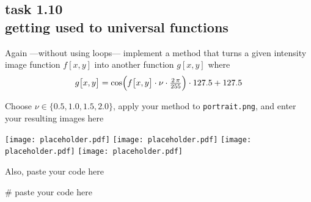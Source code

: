 
\subsection*{task 1.10 \\[1ex] getting used to universal functions}

Again ---without using  loops--- implement a method that turns a given intensity image function $f[x, y]$ into another function $g[x, y]$ where
\begin{equation*}
g \bigl[ x, y \bigr] = \cos \Bigl( f \bigl[ x, y \bigr] \cdot \nu \cdot \tfrac{2\,\pi}{255} \Bigr) \cdot 127.5 + 127.5
\end{equation*}

\vspace{1cm}
Choose $\nu \in \{ 0.5, 1.0, 1.5, 2.0 \}$, apply your method to \texttt{portrait.png}, and enter your resulting images here
\begin{center}
\texttt{[image: placeholder.pdf]} \hfill
\texttt{[image: placeholder.pdf]} \hfill
\texttt{[image: placeholder.pdf]} \hfill
\texttt{[image: placeholder.pdf]} 
\end{center}



\vspace{2cm}
Also, paste your code here \\[1ex]
\begin{python}
# paste your code here

\end{python}






